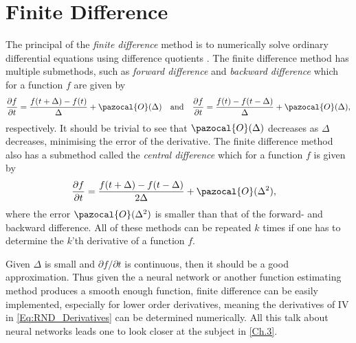 \section{Finite Difference}\label{Sec.Finite_Difference}
The principal of the \emph{finite difference} method is to numerically solve ordinary differential equations using difference quotients \citep{Hull}. The finite difference method has multiple submethods, such as \emph{forward difference} and \emph{backward difference} which for a function $f$ are given by
\begin{align*}
    \frac{\partial f}{\partial t}=\frac{f(t+\Delta)-f(t)}{\Delta}+\pazocal{O}(\Delta)\quad\textrm{and}\quad\frac{\partial f}{\partial t}=\frac{f(t)-f(t-\Delta)}{\Delta}+\pazocal{O}(\Delta),
\end{align*}
respectively. It should be trivial to see that $\pazocal{O}(\Delta)$ decreases as $\Delta$ decreases, minimising the error of the derivative. The finite difference method also has a submethod called the \emph{central difference} which for a function $f$ is given by
\begin{align*}
    \frac{\partial f}{\partial t} &= \frac{f(t+\Delta)-f(t-\Delta)}{2\Delta}+\pazocal{O}(\Delta^2),
\end{align*}
where the error $\pazocal{O}(\Delta^2)$ is smaller than that of the forward- and backward difference. All of these methods can be repeated $k$ times if one has to determine the $k$'th derivative of a function $f$.

Given $\Delta$ is small and $\partial f/\partial t$ is continuous, then it should be a good approximation. Thus given the a neural network or another function estimating method produces a smooth enough function, finite difference can be easily implemented, especially for lower order derivatives, meaning the derivatives of $\mathrm{IV}$ in \eqref{Eq:RND_Derivatives} can be determined numerically. All this talk about neural networks leads one to look closer at the subject in \autoref{Ch.3}.




